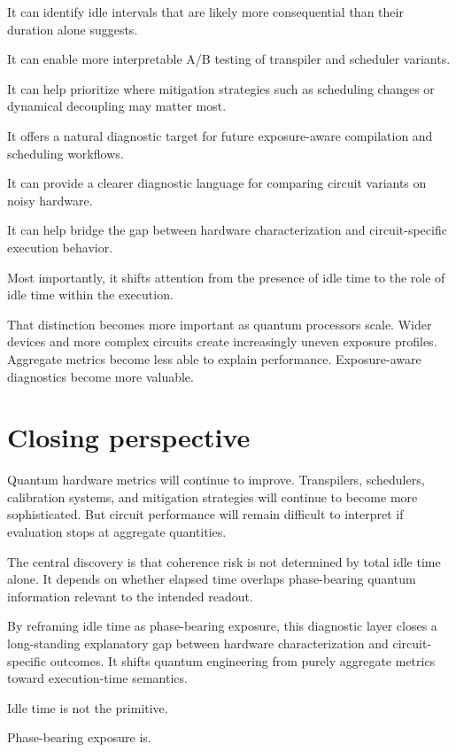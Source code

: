 \documentclass[11pt]{article}
\begin{document}
It can identify idle intervals that are likely more consequential than their duration alone suggests.

It can enable more interpretable A/B testing of transpiler and scheduler variants.

It can help prioritize where mitigation strategies such as scheduling changes or dynamical decoupling may matter most.

It offers a natural diagnostic target for future exposure-aware compilation and scheduling workflows.

It can provide a clearer diagnostic language for comparing circuit variants on noisy hardware.

It can help bridge the gap between hardware characterization and circuit-specific execution behavior.

Most importantly, it shifts attention from the presence of idle time to the role of idle time within the execution.

That distinction becomes more important as quantum processors scale. Wider devices and more complex circuits create increasingly uneven exposure profiles. Aggregate metrics become less able to explain performance. Exposure-aware diagnostics become more valuable.

\section*{Closing perspective}

Quantum hardware metrics will continue to improve. Transpilers, schedulers, calibration systems, and mitigation strategies will continue to become more sophisticated. But circuit performance will remain difficult to interpret if evaluation stops at aggregate quantities.

The central discovery is that coherence risk is not determined by total idle time alone. It depends on whether elapsed time overlaps phase-bearing quantum information relevant to the intended readout.

By reframing idle time as phase-bearing exposure, this diagnostic layer closes a long-standing explanatory gap between hardware characterization and circuit-specific outcomes. It shifts quantum engineering from purely aggregate metrics toward execution-time semantics.

Idle time is not the primitive.

Phase-bearing exposure is.
\end{document}
